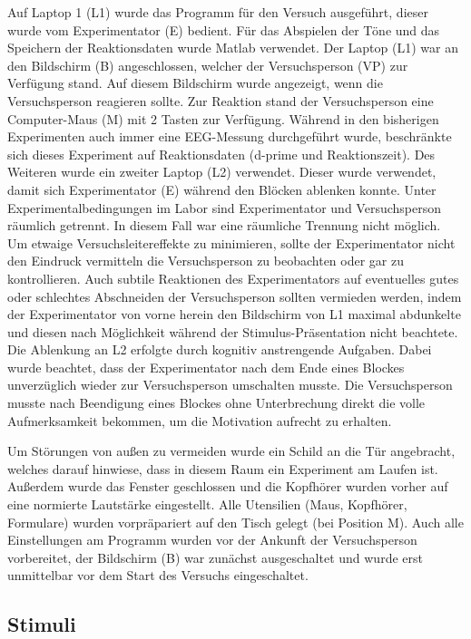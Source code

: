 \documentclass[doc,a4paper,12pt]{apa6}
\begin{document}
Auf Laptop 1 (L1) wurde das Programm für den Versuch ausgeführt, dieser wurde vom Experimentator (E) bedient. Für das Abspielen der Töne und das Speichern der Reaktionsdaten wurde Matlab verwendet. Der Laptop (L1) war an den Bildschirm (B) angeschlossen, welcher der Versuchsperson (VP) zur Verfügung stand. Auf diesem Bildschirm wurde angezeigt, wenn die Versuchsperson reagieren sollte. Zur Reaktion stand der Versuchsperson eine Computer-Maus (M) mit 2 Tasten zur Verfügung. Während in den bisherigen Experimenten auch immer eine EEG-Messung durchgeführt wurde, beschränkte sich dieses Experiment auf Reaktionsdaten (d-prime und Reaktionszeit). Des Weiteren wurde ein zweiter Laptop (L2) verwendet. Dieser wurde verwendet, damit sich Experimentator (E) während den Blöcken ablenken konnte. Unter Experimentalbedingungen im Labor sind Experimentator und Versuchsperson räumlich getrennt. In diesem Fall war eine räumliche Trennung nicht möglich. Um etwaige Versuchsleitereffekte zu minimieren, sollte der Experimentator nicht den Eindruck vermitteln die Versuchsperson zu beobachten oder gar zu kontrollieren. Auch subtile Reaktionen des Experimentators auf eventuelles gutes oder schlechtes Abschneiden der Versuchsperson sollten vermieden werden, indem der Experimentator von vorne herein den Bildschirm von L1 maximal abdunkelte und diesen nach Möglichkeit während der Stimulus-Präsentation nicht beachtete. Die Ablenkung an L2 erfolgte durch kognitiv anstrengende Aufgaben. Dabei wurde beachtet, dass der Experimentator nach dem Ende eines Blockes unverzüglich wieder zur Versuchsperson umschalten musste. Die Versuchsperson musste nach Beendigung eines Blockes ohne Unterbrechung direkt die volle Aufmerksamkeit bekommen, um die Motivation aufrecht zu erhalten.

Um Störungen von außen zu vermeiden wurde ein Schild an die Tür angebracht, welches darauf hinwiese, dass in diesem Raum ein Experiment am Laufen ist. Außerdem wurde das Fenster geschlossen und die Kopfhörer wurden vorher auf eine normierte Lautstärke eingestellt. Alle Utensilien (Maus, Kopfhörer, Formulare) wurden vorpräpariert auf den Tisch gelegt (bei Position M). Auch alle Einstellungen am Programm wurden vor der Ankunft der Versuchsperson vorbereitet, der Bildschirm (B) war zunächst ausgeschaltet und wurde erst unmittelbar vor dem Start des Versuchs eingeschaltet.

\subsection{Stimuli}
\end{document}
